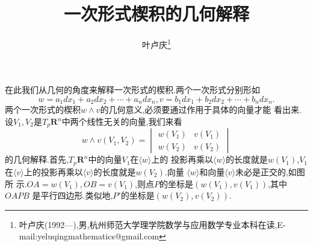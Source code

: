 \documentclass[a4paper]{article}
\begin{document}
\title{\huge{\bf{一次形式楔积的几何解释}}} \author{\small{叶卢庆\footnote{叶卢庆(1992---),男,杭州师范大学理学院数学与应用数学专业本科在读,E-mail:yeluqingmathematics@gmail.com}}}
\maketitle
在此我们从几何的角度来解释一次形式的楔积.两个一次形式分别形如
$$
w=a_1dx_1+a_2dx_2+\cdots+a_ndx_n,v=b_1dx_1+b_2dx_2+\cdots+b_ndx_n.
$$
两个一次形式的楔积$w\wedge v$的几何意义,必须要通过作用于具体的向量才能
看出来.设$V_1,V_2$是$T_p\mathbf{R}^n$中两个线性无关的向量,我们来看
$$
w\wedge v(V_1,V_2)=
\begin{vmatrix}
  w(V_1)&v(V_1)\\
w(V_2)&v(V_2)
\end{vmatrix}
$$
的几何解释.首先,$T_p\mathbf{R}^n$中的向量$V_1$在$\langle w\rangle$上的
投影再乘以$\langle w\rangle$的长度就是$w(V_1)$,$V_1$在$\langle
v\rangle$上的投影再乘以$\langle v\rangle$的长度就是$w(V_2)$.向量
$\langle w\rangle$和向量$\langle v\rangle$未必是正交的,如图所
示.$OA=w(V_1),OB=v(V_1)$,则点$P$的坐标是$(w(V_1),v(V_1))$,其中$OAPB$
是平行四边形.类似地,$P'$的坐标是$(w(V_2),v(V_2))$.\\
\end{document}
